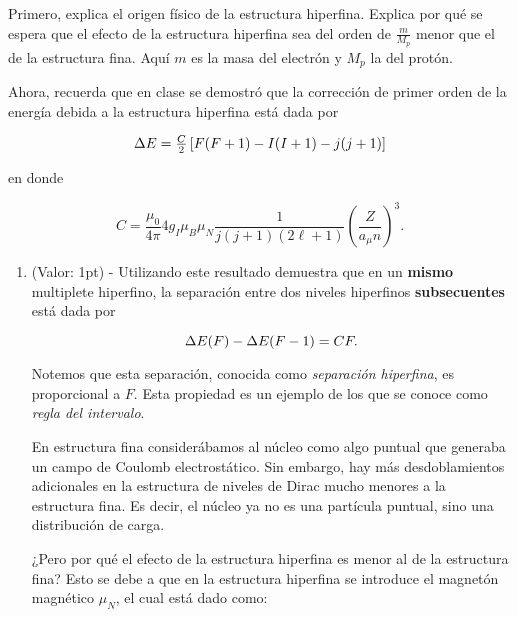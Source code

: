 \documentclass[./../main.tex]{subfiles}
\begin{document}
    \begin{exercise}
        Primero, explica el origen físico de la estructura hiperfina. Explica por qué se espera que el efecto de la estructura hiperfina sea del orden de \(\tfrac{m}{M_{p}}\) menor que el de la estructura fina. Aquí \(m\) es la masa del electrón y \(M_{p}\) la del protón.
        
        Ahora, recuerda que en clase se demostró que la corrección de primer orden de la energía debida a la estructura hiperfina está dada por

        \begin{equation*}
            \change{E} = \tfrac{C}{2}\left[F(F + 1) - I(I + 1) - j(j + 1)\right]
        \end{equation*}

        en donde

        \begin{equation*}
            C = \dfrac{\mu_{0}}{4\pi}4g_{I}\mu_{B}\mu_{N}\dfrac{1}{j(j + 1)(2\ell + 1)}\left(\dfrac{Z}{a_{\mu}n}\right)^{3}.
        \end{equation*}

        \begin{enumerate}
            \item (Valor: 1pt) - Utilizando este resultado demuestra que en un \textbf{mismo} multiplete hiperfino, la separación entre dos niveles hiperfinos \textbf{subsecuentes} está dada por
            
            \begin{equation*}
                \change{E}(F) - \change{E}(F - 1) = CF.
            \end{equation*}

            Notemos que esta separación, conocida como \emph{separación hiperfina}, es proporcional a \(F\). Esta propiedad es un ejemplo de los que se conoce como \emph{regla del intervalo}.

            \begin{solution}
                En estructura fina considerábamos al núcleo como algo puntual que generaba un campo de Coulomb electrostático. Sin embargo, hay más desdoblamientos adicionales en la estructura de niveles de Dirac mucho menores a la estructura fina. Es decir, el núcleo ya no es una partícula puntual, sino una distribución de carga.

                ¿Pero por qué el efecto de la estructura hiperfina es menor al de la estructura fina? Esto se debe a que en la estructura hiperfina se introduce el magnetón magnético \(\mu_{N}\), el cual está dado como:


\end{solution}
\end{enumerate}
\end{exercise}
\end{document}
